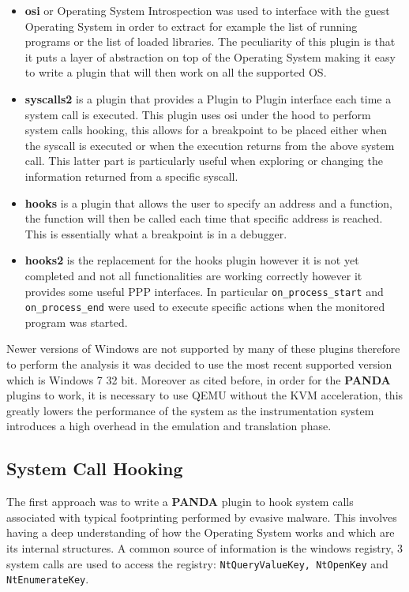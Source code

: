 \begin{itemize}
    \item \textbf{osi} or Operating System Introspection was used to interface with the guest Operating System in order to extract for example the list of running programs or the list of loaded libraries. The peculiarity of this plugin is that it puts a layer of abstraction on top of the Operating System making it easy to write a plugin that will then work on all the supported OS.
    
    \item \textbf{syscalls2} is a plugin that provides a Plugin to Plugin interface each time a system call is executed. This plugin uses osi under the hood to perform system calls hooking, this allows for a breakpoint to be placed either when the syscall is executed or when the execution returns from the above system call. This latter part is particularly useful when exploring or changing the information returned from a specific syscall.
    
    \item \textbf{hooks} is a plugin that allows the user to specify an address and a function, the function will then be called each time that specific address is reached. This is essentially what a breakpoint is in a debugger.
    
    \item \textbf{hooks2} is the replacement for the hooks plugin however it is not yet completed and not all functionalities are working correctly however it provides some useful PPP interfaces. In particular \lstinline{on_process_start} and \lstinline{on_process_end} were used to execute specific actions when the monitored program was started.
\end{itemize}

Newer versions of Windows are not supported by many of these plugins therefore to perform the analysis it was decided to use the most recent supported version which is Windows 7 32 bit.
Moreover as cited before, in order for the \textbf{PANDA} plugins to work, it is necessary to use QEMU without the KVM acceleration, this greatly lowers the performance of the system as the instrumentation system introduces a high overhead in the emulation and translation phase. 

\subsection{System Call Hooking}

The first approach was to write a \textbf{PANDA} plugin to hook system calls associated with typical footprinting performed by evasive malware. This involves having a deep understanding of how the Operating System works and which are its internal structures. A common source of information is the windows registry, 3 system calls are used to access the registry: \lstinline{NtQueryValueKey, NtOpenKey} and \lstinline{NtEnumerateKey}. 

